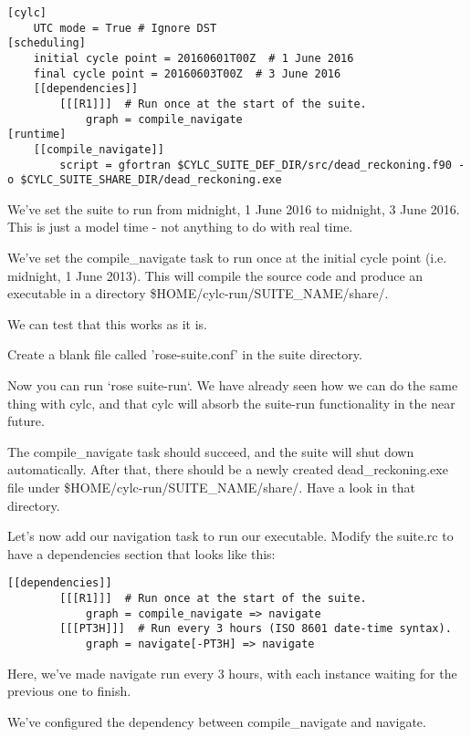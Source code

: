 \lstset{language=suiterc}
\begin{lstlisting}[columns=fullflexible]
[cylc]
    UTC mode = True # Ignore DST
[scheduling]
    initial cycle point = 20160601T00Z  # 1 June 2016
    final cycle point = 20160603T00Z  # 3 June 2016
    [[dependencies]]
        [[[R1]]]  # Run once at the start of the suite.
            graph = compile_navigate
[runtime]
    [[compile_navigate]]
        script = gfortran $CYLC_SUITE_DEF_DIR/src/dead_reckoning.f90 -o $CYLC_SUITE_SHARE_DIR/dead_reckoning.exe
\end{lstlisting}

    We've set the suite to run from midnight, 1 June 2016 to midnight, 3 June 2016. This is just a model time - not anything to do with real time.

    We've set the compile\_navigate task to run once at the initial cycle point (i.e. midnight, 1 June 2013). This will compile the source code and produce an executable in a directory \$HOME/cylc-run/SUITE\_NAME/share/.

    We can test that this works as it is.
    
    Create a blank file called 'rose-suite.conf' in the suite directory.

    Now you can run `rose suite-run`. We have already seen how we can do the same thing with cylc, and that cylc will absorb the suite-run functionality in the near future.
    
    The compile\_navigate task should succeed, and the suite will shut down automatically. After that, there should be a newly created dead\_reckoning.exe file under \$HOME/cylc-run/SUITE\_NAME/share/. Have a look in that directory.

Let's now add our navigation task to run our executable. Modify the suite.rc to have a dependencies section that looks like this:
\lstset{language=suiterc}
\begin{lstlisting}[columns=fullflexible]
    [[dependencies]]
        [[[R1]]]  # Run once at the start of the suite.
            graph = compile_navigate => navigate
        [[[PT3H]]]  # Run every 3 hours (ISO 8601 date-time syntax).
            graph = navigate[-PT3H] => navigate
\end{lstlisting}

    Here, we've made navigate run every 3 hours, with each instance waiting for the previous one to finish.

    We've configured the dependency between compile\_navigate and navigate.

